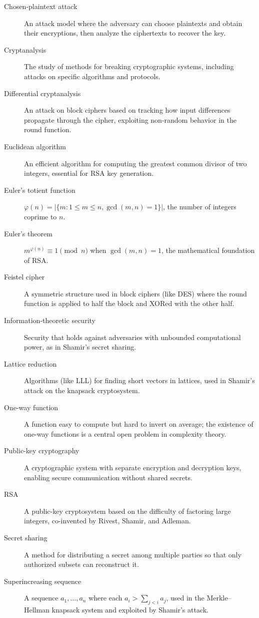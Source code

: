 \begin{description}
    \item[Chosen-plaintext attack] An attack model where the adversary can choose plaintexts and obtain their encryptions, then analyze the ciphertexts to recover the key.
    \item[Cryptanalysis] The study of methods for breaking cryptographic systems, including attacks on specific algorithms and protocols.
    \item[Differential cryptanalysis] An attack on block ciphers based on tracking how input differences propagate through the cipher, exploiting non-random behavior in the round function.
    \item[Euclidean algorithm] An efficient algorithm for computing the greatest common divisor of two integers, essential for RSA key generation.
    \item[Euler's totient function] $\varphi(n) = |\{m : 1 \leq m \leq n, \gcd(m,n) = 1\}|$, the number of integers coprime to $n$.
    \item[Euler's theorem] $m^{\varphi(n)} \equiv 1 \pmod n$ when $\gcd(m, n) = 1$, the mathematical foundation of RSA.
    \item[Feistel cipher] A symmetric structure used in block ciphers (like DES) where the round function is applied to half the block and XORed with the other half.
    \item[Information-theoretic security] Security that holds against adversaries with unbounded computational power, as in Shamir's secret sharing.
    \item[Lattice reduction] Algorithms (like LLL) for finding short vectors in lattices, used in Shamir's attack on the knapsack cryptosystem.
    \item[One-way function] A function easy to compute but hard to invert on average; the existence of one-way functions is a central open problem in complexity theory.
    \item[Public-key cryptography] A cryptographic system with separate encryption and decryption keys, enabling secure communication without shared secrets.
    \item[RSA] A public-key cryptosystem based on the difficulty of factoring large integers, co-invented by Rivest, Shamir, and Adleman.
    \item[Secret sharing] A method for distributing a secret among multiple parties so that only authorized subsets can reconstruct it.
    \item[Superincreasing sequence] A sequence $a_1, \ldots, a_n$ where each $a_i > \sum_{j<i} a_j$, used in the Merkle--Hellman knapsack system and exploited by Shamir's attack.

\end{description}
